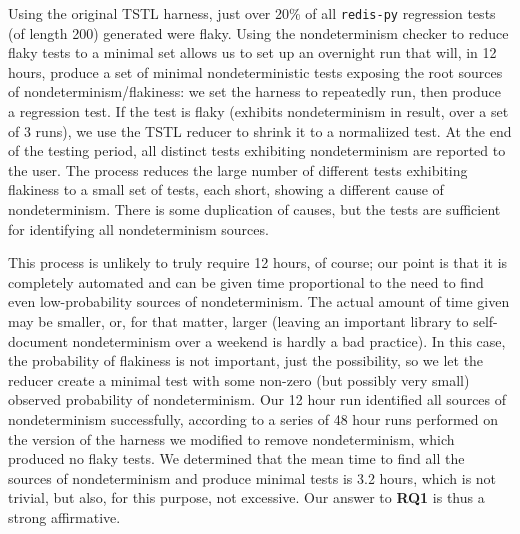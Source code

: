 {Using the original TSTL harness, just over 20\% of all {\tt redis-py}
regression tests (of length 200) generated were flaky.  Using the
nondeterminism checker to reduce flaky tests to a minimal set allows
us to set up an overnight run that will, in 12 hours, produce
a set of minimal nondeterministic tests exposing the root sources of
nondeterminism/flakiness: we set the harness to repeatedly run, then
produce a regression test.  If the test is flaky (exhibits
nondeterminism in result, over a set of 3 runs), we use the TSTL reducer to shrink it to a
normaliized \cite{onetest} test.  At the end of the testing period,
all distinct tests exhibiting nondeterminism are reported to the
user.  The process reduces the large number of different tests
exhibiting flakiness to a small set of tests, each short, showing a
different cause of nondeterminism.  
There is some duplication of causes, but the tests are sufficient for
identifying all nondeterminism sources.

This process is unlikely to truly require 12
hours, of course; our point is that it is completely automated and
can be given time proportional to the need to find even
low-probability sources of nondeterminism.  The actual amount of time given
may be smaller, or, for that matter, larger (leaving an important
library to self-document nondeterminism over a weekend is hardly a bad
practice).  In this case, the probability of flakiness
is not important, just the possibility, so we let the reducer
create a minimal test with some non-zero (but possibly very small)
observed probability of nondeterminism.  Our 12 hour run identified
all sources of nondeterminism successfully, according to a series of
48 hour runs performed on the version of the harness we modified to
remove nondeterminism, which produced no flaky tests.  We determined that the mean time to find all
the sources of nondeterminism and produce minimal tests is 3.2
hours, which is not trivial, but also, for this purpose, not
excessive.  Our answer to {\bf RQ1} is thus a strong affirmative.

}
